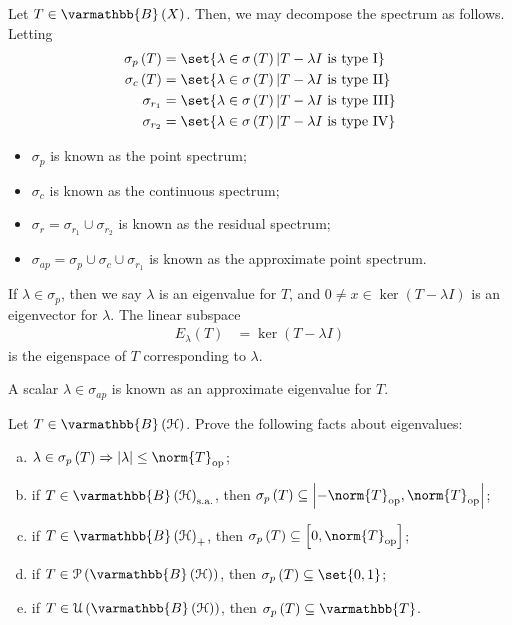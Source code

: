 \documentclass[10pt]{mypackage}
\renewcommand*{\mathbb}[1]{\varmathbb{#1}}
\newcommand{\sa}{\text{s.a.}}
\newcommand{\B}{\mathbb{B}}
\begin{document}
\begin{definition}
  Let $T\in \B\left(X\right)$. Then, we may decompose the spectrum as follows. Letting
  \begin{align*}
    \sigma_p\left(T\right) &= \set{\lambda\in \sigma\left(T\right) | T - \lambda I\text{ is type I}}\\
    \sigma_{c}\left(T\right) &= \set{\lambda\in \sigma\left(T\right) | T - \lambda I\text{ is type II}}\\
    \sigma_{r_1} &= \set{\lambda\in \sigma\left(T\right) | T - \lambda I\text{ is type III}}\\
    \sigma_{r_2} &= \set{\lambda\in \sigma\left(T\right) | T - \lambda I\text{ is type IV}}
  \end{align*}
  \begin{itemize}
    \item $\sigma_p$ is known as the point spectrum;
    \item $\sigma_{c}$ is known as the continuous spectrum;
    \item $\sigma_{r} = \sigma_{r_1}\cup \sigma_{r_2}$ is known as the residual spectrum;
    \item $\sigma_{ap} = \sigma_p \cup \sigma_c \cup \sigma_{r_1}$ is known as the approximate point spectrum.
  \end{itemize}
  If $\lambda \in \sigma_p$, then we say $\lambda$ is an eigenvalue for $T$, and $0\neq x\in \ker\left(T - \lambda I\right)$ is an eigenvector for $\lambda$. The linear subspace
  \begin{align*}
    E_{\lambda}\left(T\right) &= \ker\left(T - \lambda I\right)
  \end{align*}
  is the eigenspace of $T$ corresponding to $\lambda$.\newline

  A scalar $\lambda \in \sigma_{ap}$ is known as an approximate eigenvalue for $T$.
\end{definition}
\begin{exercise}
  Let $T\in \B\left(\mathcal{H}\right)$. Prove the following facts about eigenvalues:
  \begin{enumerate}[(a)]
    \item $\lambda\in \sigma_p\left(T\right) \Rightarrow \left\vert \lambda \right\vert \leq \norm{T}_{\text{op}}$;
    \item if $T\in \B\left(\mathcal{H}\right)_{\sa}$, then $\sigma_p\left(T\right) \subseteq \left\vert -\norm{T}_{\text{op}},\norm{T}_{\text{op}} \right\vert$;
    \item if $T\in \B\left(\mathcal{H}\right)_{+}$, then $\sigma_p\left(T\right)\subseteq \left[0,\norm{T}_{\text{op}}\right]$;
    \item if $T\in \mathcal{P}\left(\B\left(\mathcal{H}\right)\right)$, then $\sigma_p\left(T\right)\subseteq \set{0,1}$;
    \item if $T\in \mathcal{U}\left(\B\left(\mathcal{H}\right)\right)$, then $\sigma_p\left(T\right)\subseteq \mathbb{T}$.
  \end{enumerate}
\end{exercise}
\end{document}
